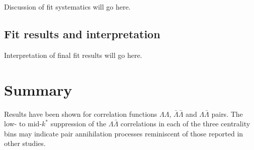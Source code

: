 Discussion of fit systematics will go here.

\subsection{Fit results and interpretation}
\label{sec:FitResults}

Interpretation of final fit results will go here.

\section{Summary}
Results have been shown for correlation functions $\Lambda\Lambda$, $\bar{\Lambda}\bar{\Lambda}$ and $\Lambda\bar{\Lambda}$ pairs.  The low- to mid-$k^*$ suppression of the $\Lambda\bar{\Lambda}$ correlations in each of the three centrality bins may indicate pair annihilation processes reminiscent of those reported in other studies.











%
